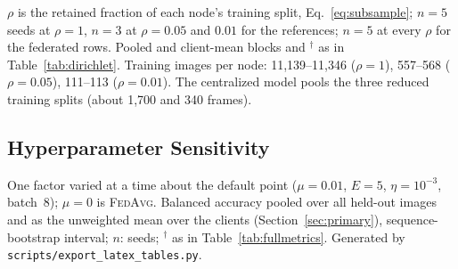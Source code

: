 \documentclass[journal]{IEEEtran}
\newcommand{\fedavg}{\textsc{FedAvg}}
\begin{document}
\begin{table}[t]
\centering
\caption{Test Balanced Accuracy (\%) at the Selected Round in the Low-Data Regime (3-Node, Group-Level Split, mean [95\% CI])}
\label{tab:lowdata}

\vspace{2pt}
\footnotesize{$\rho$ is the retained fraction of each node's training split, Eq.~\eqref{eq:subsample}; $n=5$ seeds at $\rho=1$, $n=3$ at $\rho=0.05$ and $0.01$ for the references; $n=5$ at every $\rho$ for the federated rows. Pooled and client-mean blocks and $^{\dagger}$ as in Table~\ref{tab:dirichlet}. Training images per node: 11{,}139--11{,}346 ($\rho=1$), 557--568 ($\rho=0.05$), 111--113 ($\rho=0.01$). The centralized model pools the three reduced training splits (about 1{,}700 and 340 frames).}
\end{table}

\subsection{Hyperparameter Sensitivity}
\label{sec:res_sensitivity}

\begin{table}[t]
\centering
\caption{Sensitivity of the Selected-Round Test Balanced Accuracy to the Local and Federation Hyperparameters (3-Node, Manual Label Skew, Three Rounds, mean [95\% CI])}
\label{tab:sensitivity}
\setlength{\tabcolsep}{1pt}
{\scriptsize
}
\vspace{2pt}
\footnotesize{One factor varied at a time about the default point ($\mu{=}0.01$, $E{=}5$, $\eta{=}10^{-3}$, batch~8); $\mu{=}0$ is \fedavg{}. Balanced accuracy pooled over all held-out images and as the unweighted mean over the clients (Section~\ref{sec:primary}), sequence-bootstrap interval; $n$: seeds; $^{\dagger}$ as in Table~\ref{tab:fullmetrics}. Generated by \texttt{scripts/export\_latex\_tables.py}.}
\end{table}
\end{document}
